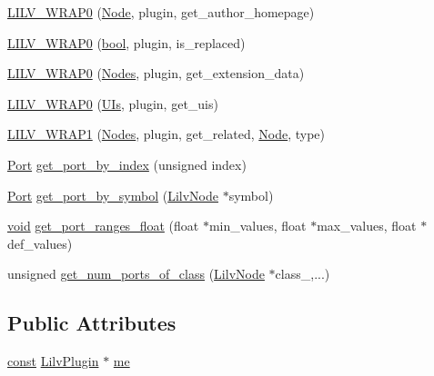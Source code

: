 \begin{DoxyCompactItemize}
\item 
\hyperlink{struct_lilv_1_1_plugin_ad7d694c28e6298793377925a01ab0aa3}{L\+I\+L\+V\+\_\+\+W\+R\+A\+P0} (\hyperlink{struct_lilv_1_1_node}{Node}, plugin, get\+\_\+author\+\_\+homepage)
\item 
\hyperlink{struct_lilv_1_1_plugin_adbb09ad406fce23753d18a363d01c7ec}{L\+I\+L\+V\+\_\+\+W\+R\+A\+P0} (\hyperlink{mac_2config_2i386_2lib-src_2libsoxr_2soxr-config_8h_abb452686968e48b67397da5f97445f5b}{bool}, plugin, is\+\_\+replaced)
\item 
\hyperlink{struct_lilv_1_1_plugin_a37e9e1c0469f9bb88a8c1686b0bdb1ac}{L\+I\+L\+V\+\_\+\+W\+R\+A\+P0} (\hyperlink{struct_lilv_1_1_nodes}{Nodes}, plugin, get\+\_\+extension\+\_\+data)
\item 
\hyperlink{struct_lilv_1_1_plugin_a1c465767058b26c967e9763e915c39be}{L\+I\+L\+V\+\_\+\+W\+R\+A\+P0} (\hyperlink{struct_lilv_1_1_u_is}{U\+Is}, plugin, get\+\_\+uis)
\item 
\hyperlink{struct_lilv_1_1_plugin_a12b016e8164af5e630d71f68058f110b}{L\+I\+L\+V\+\_\+\+W\+R\+A\+P1} (\hyperlink{struct_lilv_1_1_nodes}{Nodes}, plugin, get\+\_\+related, \hyperlink{struct_lilv_1_1_node}{Node}, type)
\item 
\hyperlink{struct_lilv_1_1_port}{Port} \hyperlink{struct_lilv_1_1_plugin_a40659886c7904f113745c5aaa6ad8524}{get\+\_\+port\+\_\+by\+\_\+index} (unsigned index)
\item 
\hyperlink{struct_lilv_1_1_port}{Port} \hyperlink{struct_lilv_1_1_plugin_acf9a8f5dd89bdd1afca0ae2c89ffe38d}{get\+\_\+port\+\_\+by\+\_\+symbol} (\hyperlink{lilv_8h_ae183dca3dca5368d34dbd863a405437b}{Lilv\+Node} $\ast$symbol)
\item 
\hyperlink{sound_8c_ae35f5844602719cf66324f4de2a658b3}{void} \hyperlink{struct_lilv_1_1_plugin_adafe30dcde235e14a1c10fd1b33317fb}{get\+\_\+port\+\_\+ranges\+\_\+float} (float $\ast$min\+\_\+values, float $\ast$max\+\_\+values, float $\ast$def\+\_\+values)
\item 
unsigned \hyperlink{struct_lilv_1_1_plugin_ae7083432585a7eecfc26b3e711dfe855}{get\+\_\+num\+\_\+ports\+\_\+of\+\_\+class} (\hyperlink{lilv_8h_ae183dca3dca5368d34dbd863a405437b}{Lilv\+Node} $\ast$class\+\_,...)
\end{DoxyCompactItemize}
\subsection*{Public Attributes}
\begin{DoxyCompactItemize}
\item 
\hyperlink{getopt1_8c_a2c212835823e3c54a8ab6d95c652660e}{const} \hyperlink{lilv_8h_a94e36303167a78a0c392f881136b461b}{Lilv\+Plugin} $\ast$ \hyperlink{struct_lilv_1_1_plugin_ac064833dfcf7b6ac77898d0fb4112de2}{me}
\end{DoxyCompactItemize}


